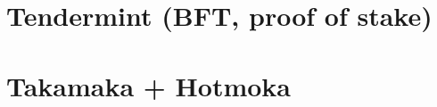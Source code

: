 \documentclass[11pt]{beamer}  %
\begin{document}
\section{Tendermint (BFT, proof of stake)}

\section{Takamaka + Hotmoka}
\end{document}
